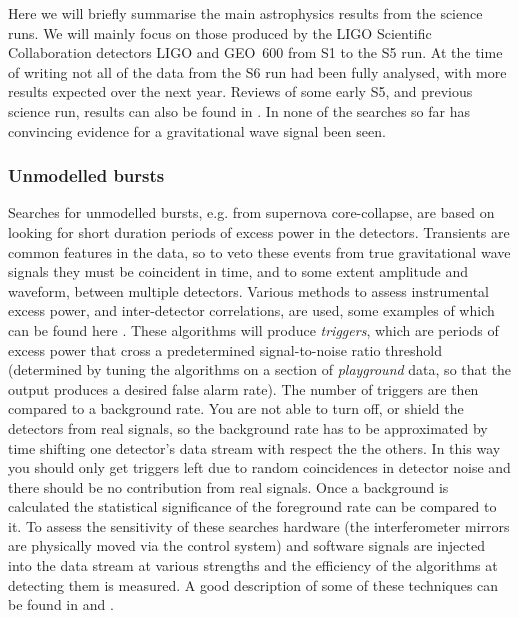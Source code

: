 \documentclass{article}
\begin{document}
Here we will briefly summarise the main astrophysics results from the science 
runs. We will mainly focus on those produced by the LIGO Scientific
Collaboration \cite{LSCweb} detectors LIGO and GEO~600 from S1 to the S5 run. 
At the time of writing not all of the data from the S6 run had been
fully analysed, with more results expected over the next year. Reviews of some
early S5, and previous science run, results can also be found in
\cite{Papa:2008, Fairhurst:2009}. In none of the searches so far has convincing
evidence for a gravitational wave signal been seen.

\subsubsection{Unmodelled bursts}\label{subsubsection:unmodelled}
Searches for unmodelled bursts, e.g. from supernova core-collapse, are based on
looking for short duration periods of excess power in the detectors. Transients
are common features in the data, so to veto these events from true
gravitational wave signals they must be coincident in time, and to some extent
amplitude and waveform, between multiple detectors. Various methods to assess
instrumental excess power, and inter-detector correlations, are used, some
examples of which can be found here \cite{Klimenko:2004, Anderson:2001,
Searle:2008, McNabb:2004, Cadonati:2004, Chatterji:2004, Chatterji:2006}. These
algorithms will produce {\it triggers}, which are periods of excess power that
cross a predetermined signal-to-noise ratio threshold (determined by tuning the
algorithms on a section of {\it playground} data, so that the output produces a
desired false alarm rate). The number of triggers are then compared to a
background rate. You are not able to turn off, or shield the detectors from real
signals, so the background rate has to be approximated by time shifting one
detector's data stream with respect the the others. In this way you should only
get triggers left due to random coincidences in detector noise and there should
be no contribution from real signals. Once a background is calculated the
statistical significance of the foreground rate can be compared to it. To assess
the sensitivity of these searches hardware (the interferometer mirrors are
physically moved via the control system) and software signals are injected into
the data stream at various strengths and the efficiency of the algorithms at
detecting them is measured. A good description of some of these techniques can be
found in \cite{Abbott:2004b} and \cite{Abbott:2006a}.
\end{document}
